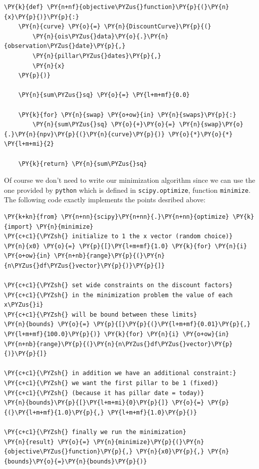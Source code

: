 \begin{tcolorbox}[breakable, size=fbox, boxrule=1pt, pad at break*=1mm,colback=cellbackground, colframe=cellborder]
\begin{Verbatim}[commandchars=\\\{\}]
\PY{k}{def} \PY{n+nf}{objective\PYZus{}function}\PY{p}{(}\PY{n}{x}\PY{p}{)}\PY{p}{:}             
    \PY{n}{curve} \PY{o}{=} \PY{n}{DiscountCurve}\PY{p}{(}       
        \PY{n}{ois\PYZus{}data}\PY{o}{.}\PY{n}{observation\PYZus{}date}\PY{p}{,}
        \PY{n}{pillar\PYZus{}dates}\PY{p}{,}
        \PY{n}{x}
    \PY{p}{)}
    
    \PY{n}{sum\PYZus{}sq} \PY{o}{=} \PY{l+m+mf}{0.0}
    
    \PY{k}{for} \PY{n}{swap} \PY{o+ow}{in} \PY{n}{swaps}\PY{p}{:}
        \PY{n}{sum\PYZus{}sq} \PY{o}{+}\PY{o}{=} \PY{n}{swap}\PY{o}{.}\PY{n}{npv}\PY{p}{(}\PY{n}{curve}\PY{p}{)} \PY{o}{*}\PY{o}{*} \PY{l+m+mi}{2}
        
    \PY{k}{return} \PY{n}{sum\PYZus{}sq}
\end{Verbatim}
\end{tcolorbox}

Of course we don't need to write our minimization algorithm since we can use the one provided by \texttt{python} which is defined in \texttt{scipy.optimize}, function \texttt{minimize}.
The following code exactly implements the points desribed above:

\begin{tcolorbox}[breakable, size=fbox, boxrule=1pt, pad at break*=1mm,colback=cellbackground, colframe=cellborder]
\begin{Verbatim}[commandchars=\\\{\}]
\PY{k+kn}{from} \PY{n+nn}{scipy}\PY{n+nn}{.}\PY{n+nn}{optimize} \PY{k}{import} \PY{n}{minimize}   
\PY{c+c1}{\PYZsh{} initialize to 1 the x vector (random choice)}
\PY{n}{x0} \PY{o}{=} \PY{p}{[}\PY{l+m+mf}{1.0} \PY{k}{for} \PY{n}{i} \PY{o+ow}{in} \PY{n+nb}{range}\PY{p}{(}\PY{n}{n\PYZus{}df\PYZus{}vector}\PY{p}{)}\PY{p}{]} 

\PY{c+c1}{\PYZsh{} set wide constraints on the discount factors}
\PY{c+c1}{\PYZsh{} in the minimization problem the value of each x\PYZus{}i}
\PY{c+c1}{\PYZsh{} will be bound between these limits}
\PY{n}{bounds} \PY{o}{=} \PY{p}{[}\PY{p}{(}\PY{l+m+mf}{0.01}\PY{p}{,} \PY{l+m+mf}{100.0}\PY{p}{)} \PY{k}{for} \PY{n}{i} \PY{o+ow}{in} \PY{n+nb}{range}\PY{p}{(}\PY{n}{n\PYZus{}df\PYZus{}vector}\PY{p}{)}\PY{p}{]} 

\PY{c+c1}{\PYZsh{} in addition we have an additional constraint:}
\PY{c+c1}{\PYZsh{} we want the first pillar to be 1 (fixed)}
\PY{c+c1}{\PYZsh{} (because it has pillar date = today)}
\PY{n}{bounds}\PY{p}{[}\PY{l+m+mi}{0}\PY{p}{]} \PY{o}{=} \PY{p}{(}\PY{l+m+mf}{1.0}\PY{p}{,} \PY{l+m+mf}{1.0}\PY{p}{)}

\PY{c+c1}{\PYZsh{} finally we run the minimization}
\PY{n}{result} \PY{o}{=} \PY{n}{minimize}\PY{p}{(}\PY{n}{objective\PYZus{}function}\PY{p}{,} \PY{n}{x0}\PY{p}{,} \PY{n}{bounds}\PY{o}{=}\PY{n}{bounds}\PY{p}{)}
\end{Verbatim}
\end{tcolorbox}

